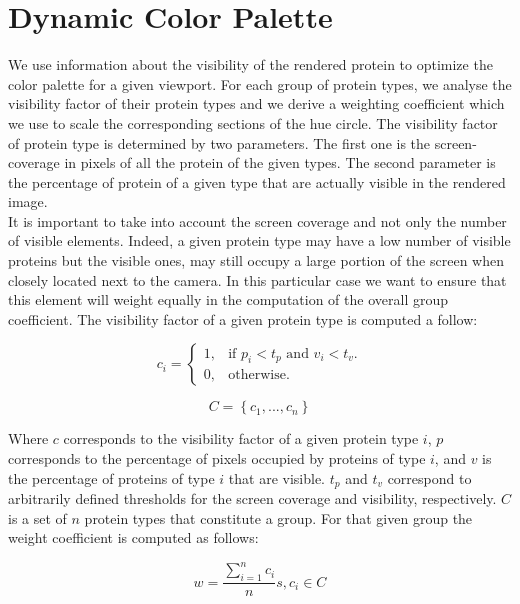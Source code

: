 \documentclass[review,journal]{vgtc}         %
\begin{document}
\section{Dynamic Color Palette}

We use information about the visibility of the rendered protein to optimize the color palette for a given viewport.
For each group of protein types, we analyse the visibility factor of their protein types and we derive a weighting coefficient which we use to scale the corresponding sections of the hue circle.
The visibility factor of protein type is determined by two parameters.
The first one is the screen-coverage in pixels of all the protein of the given types.
The second parameter is the percentage of protein of a given type that are actually visible in the rendered image. \\

It is important to take into account the screen coverage and not only the number of visible elements.
Indeed, a given protein type may have a low number of visible proteins but the visible ones, may still occupy a large portion of the screen when closely located next to the camera.
In this particular case we want to ensure that this element will weight equally in the computation of the overall group coefficient.
The visibility factor of a given protein type is computed a follow:

\begin{equation}
c_{i}=\begin{cases}
1, & \text{if $p_{i}<t_{p}$ and $v_{i}<t_{v}$}.\\
0, & \text{otherwise}.
\end{cases}
\end{equation}

\begin{equation}
C = \left\lbrace c_{1}, ... , c_{n} \right\rbrace 
\end{equation}

Where $c$ corresponds to the visibility factor of a given protein type $i$, $p$ corresponds to the percentage of pixels occupied by proteins of type $i$, and $v$ is the percentage of proteins of type $i$ that are visible.
$t_{p}$ and $t_{v}$ correspond to arbitrarily defined thresholds for the screen coverage and visibility, respectively. 
$C$ is a set of $n$ protein types that constitute a group.
For that given group the weight coefficient is computed as follows:

\begin{equation}
w = \frac{\sum_{i=1}^{n} c_{i}}{n} s, c_{i} \in C
\end{equation}
\end{document}
